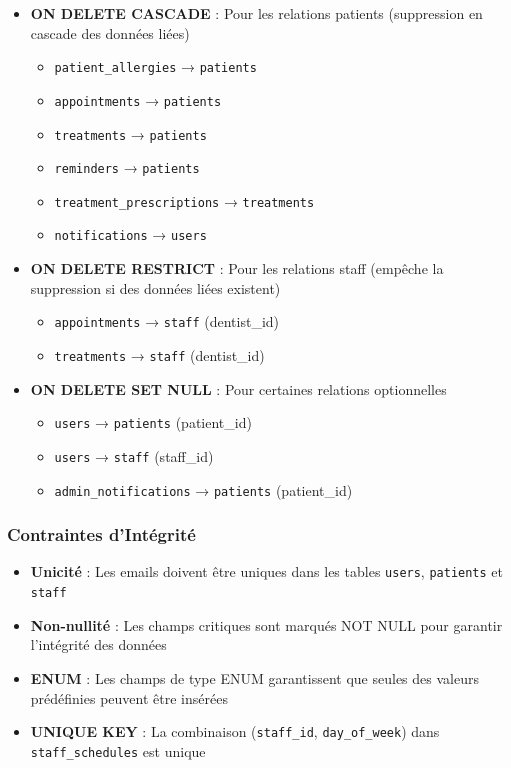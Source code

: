 \documentclass[12pt,a4paper]{report}
\begin{document}
\begin{itemize}
    \item \textbf{ON DELETE CASCADE} : Pour les relations patients (suppression en cascade des données liées)
    \begin{itemize}
        \item \texttt{patient\_allergies} → \texttt{patients}
        \item \texttt{appointments} → \texttt{patients}
        \item \texttt{treatments} → \texttt{patients}
        \item \texttt{reminders} → \texttt{patients}
        \item \texttt{treatment\_prescriptions} → \texttt{treatments}
        \item \texttt{notifications} → \texttt{users}
    \end{itemize}
    
    \item \textbf{ON DELETE RESTRICT} : Pour les relations staff (empêche la suppression si des données liées existent)
    \begin{itemize}
        \item \texttt{appointments} → \texttt{staff} (dentist\_id)
        \item \texttt{treatments} → \texttt{staff} (dentist\_id)
    \end{itemize}
    
    \item \textbf{ON DELETE SET NULL} : Pour certaines relations optionnelles
    \begin{itemize}
        \item \texttt{users} → \texttt{patients} (patient\_id)
        \item \texttt{users} → \texttt{staff} (staff\_id)
        \item \texttt{admin\_notifications} → \texttt{patients} (patient\_id)
    \end{itemize}
\end{itemize}

\subsubsection{Contraintes d'Intégrité}

\begin{itemize}
    \item \textbf{Unicité} : Les emails doivent être uniques dans les tables \texttt{users}, \texttt{patients} et \texttt{staff}
    \item \textbf{Non-nullité} : Les champs critiques sont marqués NOT NULL pour garantir l'intégrité des données
    \item \textbf{ENUM} : Les champs de type ENUM garantissent que seules des valeurs prédéfinies peuvent être insérées
    \item \textbf{UNIQUE KEY} : La combinaison (\texttt{staff\_id}, \texttt{day\_of\_week}) dans \texttt{staff\_schedules} est unique
\end{itemize}
\end{document}
